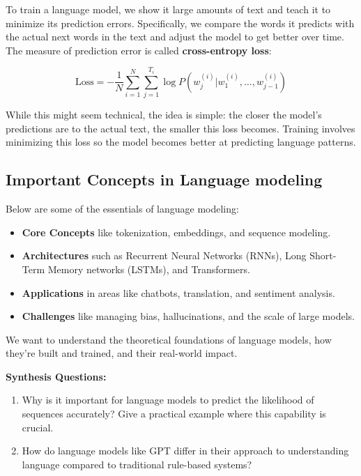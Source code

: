 \begin{flushleft}
    \large To train a language model, we show it large amounts of text and teach it to minimize its prediction errors. Specifically, we compare the words it predicts with the actual next words in the text and adjust the model to get better over time. The measure of prediction error is called \textbf{cross-entropy loss}:

    \[
    \text{Loss} = - \frac{1}{N} \sum_{i=1}^N \sum_{j=1}^{T_i} \log P(w_j^{(i)} | w_{1}^{(i)}, \dots, w_{j-1}^{(i)})
    \]

    While this might seem technical, the idea is simple: the closer the model’s predictions are to the actual text, the smaller this loss becomes. Training involves minimizing this loss so the model becomes better at predicting language patterns.
\end{flushleft}

\subsection{Important Concepts in Language modeling}

\begin{flushleft}
    \large Below are some of the essentials of language modeling:
    \begin{itemize}
        \item \textbf{Core Concepts} like tokenization, embeddings, and sequence modeling.
        \item \textbf{Architectures} such as Recurrent Neural Networks (RNNs), Long Short-Term Memory networks (LSTMs), and Transformers.
        \item \textbf{Applications} in areas like chatbots, translation, and sentiment analysis.
        \item \textbf{Challenges} like managing bias, hallucinations, and the scale of large models.
    \end{itemize}
    We want to understand the theoretical foundations of language models, how they’re built and trained, and their real-world impact.
\end{flushleft}

\begin{questionbox}
\textbf{Synthesis Questions:}
\begin{enumerate}
    \item Why is it important for language models to predict the likelihood of sequences accurately? Give a practical example where this capability is crucial.
    \item How do language models like GPT differ in their approach to understanding language compared to traditional rule-based systems?
\end{enumerate}
\end{questionbox}


